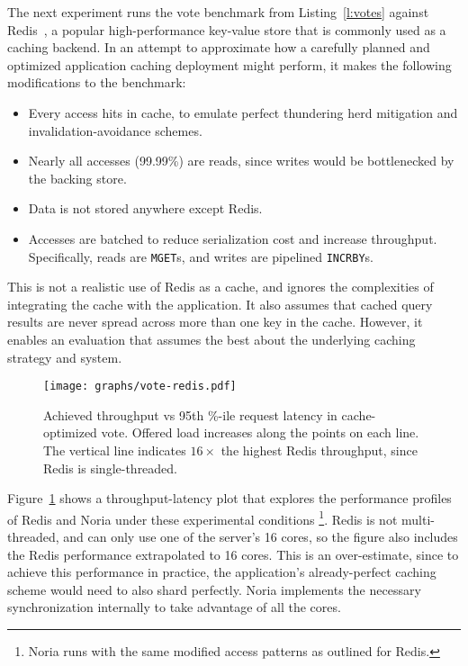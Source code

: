 The next experiment runs the vote benchmark from Listing~\ref{l:votes} against
Redis~\cite{redis}, a popular high-performance key-value store that is commonly
used as a caching backend. In an attempt to approximate how a carefully planned
and optimized application caching deployment might perform, it makes the
following modifications to the benchmark:

\begin{itemize}
 \item Every access hits in cache, to emulate perfect thundering herd mitigation
   and invalidation-avoidance schemes.
 \item Nearly all accesses (99.99\%) are reads, since writes would be
   bottlenecked by the backing store.
 \item Data is not stored anywhere except Redis.
 \item Accesses are batched to reduce serialization cost and increase
   throughput. Specifically, reads are \texttt{MGET}s, and writes are pipelined
    \texttt{INCRBY}s.
\end{itemize}

This is not a realistic use of Redis as a cache, and ignores the complexities of
integrating the cache with the application. It also assumes that cached query
results are never spread across more than one key in the cache. However, it
enables an evaluation that assumes the best about the underlying caching
strategy and system.

\begin{figure}[h]
  \centering
  \texttt{[image: graphs/vote-redis.pdf]}
  \caption{Achieved throughput vs 95th \%-ile request latency in cache-optimized
  vote. Offered load increases along the points on each line. The vertical
  line indicates $16\times$ the highest Redis throughput, since Redis is
  single-threaded.}
  \label{f:vote-redis}
\end{figure}

Figure~\ref{f:vote-redis} shows a throughput-latency plot that explores the
performance profiles of Redis and Noria under these experimental conditions%
\footnote{Noria runs with the same modified access patterns as outlined for
Redis.}.
Redis is not multi-threaded, and can only use one of the server's 16 cores, so
the figure also includes the Redis performance extrapolated to 16 cores. This is
an over-estimate, since to achieve this performance in practice, the
application's already-perfect caching scheme would need to also shard perfectly.
Noria implements the necessary synchronization internally to take advantage of
all the cores.


